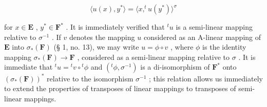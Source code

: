 \[
\langle u (x), y ^ {*} \rangle = \langle x, ^ {t} u (y ^ {*}) \rangle^ {\sigma}\tag{20}
\]

for \(x \in \mathbf{E}\) , \(y^* \in \mathbf{F}^*\) . It is immediately verified that \({}^t u\) is a semi-linear mapping relative to \(\sigma^{-1}\) . If \(v\) denotes the mapping \(u\) considered as an A-linear mapping of \(\mathbf{E}\) into \(\sigma_*(\mathbf{F})\) (§ 1, no. 13), we may write \(u = \phi \circ v\) , where \(\phi\) is the identity mapping \(\sigma_*(\mathbf{F}) \to \mathbf{F}\) , considered as a semi-linear mapping relative to \(\sigma\) . It is immediate that \({}^t u = {}^t v \circ {}^t \phi\) and \(({}^t \phi, \sigma^{-1})\) is a di-isomorphism of \(\mathbf{F}^*\) onto \((\sigma_*(\mathbf{F}))^*\) relative to the isomorphism \(\sigma^{-1}\) ; this relation allows us immediately to extend the properties of transposes of linear mappings to transposes of semi-linear mappings.

